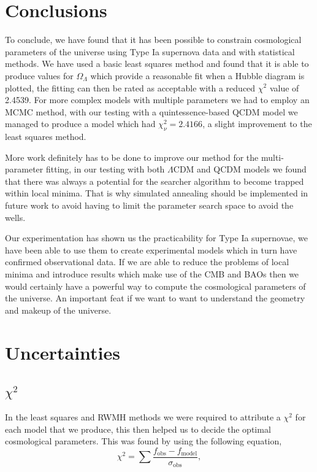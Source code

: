\documentclass[twocolumn]{revtex4}
\begin{document}
{{{\vspace{-3ex}
\section{Conclusions}
\vspace{-2ex}
To conclude, we have found that it has been possible to constrain cosmological parameters of the universe using Type Ia supernova data and with statistical methods. We have used a basic least squares method and found that it is able to produce values for $\Omega_\Lambda$ which provide a reasonable fit when a Hubble diagram is plotted, the fitting can then be rated as acceptable with a reduced $\chi^2$ value of 2.4539. For more complex models with multiple parameters we had to employ an MCMC method, with our testing with a quintessence-based QCDM model we managed to produce a model which had $\chi^2_\nu=2.4166$, a slight improvement to the least squares method.

More work definitely has to be done to improve our method for the multi-parameter fitting, in our testing with both $\Lambda$CDM and QCDM models we found that there was always a potential for the searcher algorithm to become trapped within local minima. That is why simulated annealing should be implemented in future work to avoid having to limit the parameter search space to avoid the wells. 

Our experimentation has shown us the practicability for Type Ia supernovae, we have been able to use them to create experimental models which in turn have confirmed observational data. If we are able to reduce the problems of local minima and introduce results which make use of the CMB and BAOs then we would certainly have a powerful way to compute the cosmological parameters of the universe. An important feat if we want to want to understand the geometry and makeup of the universe.

\vspace{-3ex}



\clearpage
\appendix

\vfill
\twocolumngrid
\vspace{-3ex}
\section{Uncertainties}
\vspace{-2ex}
\subsection{$\chi^2$}
\vspace{-2ex}
In the least squares and RWMH methods we were required to attribute a $\chi^2$ for each model that we produce, this then helped us to decide the optimal cosmological parameters. This was found by using the following equation, 
\begin{equation}
\chi^2 = \sum \frac{f_\text{obs}-f_\text{model}}{\sigma_\text{obs}},
\end{equation}

}}}
\end{document}
